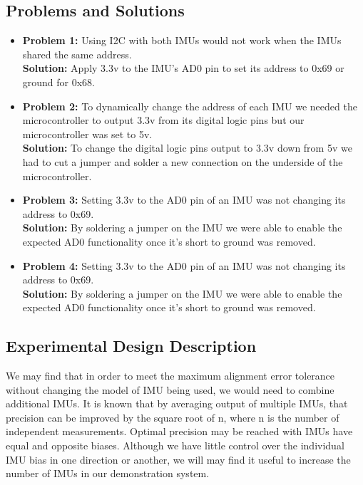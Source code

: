 \subsection{Problems and Solutions}
\begin{itemize}
	\item \textbf{Problem 1:}
	Using I2C with both IMUs would not work when the IMUs shared the same address.\\

	\textbf{Solution:}
	Apply 3.3v to the IMU's AD0 pin to set its address to 0x69 or ground for 0x68.\\
	
	\item \textbf{Problem 2:}
	To dynamically change the address of each IMU we needed the microcontroller to output 3.3v from its digital logic pins but our microcontroller was set to 5v.\\

	\textbf{Solution:}
	To change the digital logic pins output to 3.3v down from 5v we had to cut a jumper and solder a new connection on the underside of the microcontroller.\\

	\item \textbf{Problem 3:}
	Setting 3.3v to the AD0 pin of an IMU was not changing its address to 0x69.\\

	\textbf{Solution:}
	By soldering a jumper on the IMU we were able to enable the expected AD0 functionality once it's short to ground was removed.\\

	\item \textbf{Problem 4:}
	Setting 3.3v to the AD0 pin of an IMU was not changing its address to 0x69.\\

	\textbf{Solution:}
	By soldering a jumper on the IMU we were able to enable the expected AD0 functionality once it's short to ground was removed.\\

\end{itemize}

\subsection{Experimental Design Description}
We may find that in order to meet the maximum alignment error tolerance without changing the model of IMU being used, we would need to combine additional IMUs.
It is known that by averaging output of multiple IMUs, that precision can be improved by the square root of n, where n is the number of independent measurements.
Optimal precision may be reached with IMUs have equal and opposite biases.
Although we have little control over the individual IMU bias in one direction or another, we will may find it useful to increase the number of IMUs in our demonstration system.